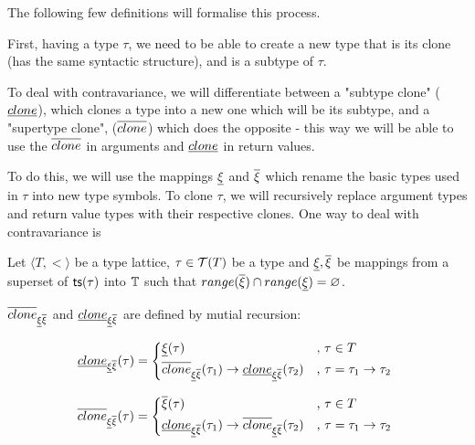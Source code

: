 \documentclass[main.tex]{subfiles}
\begin{document}
The following few definitions will formalise this process.

First, having a type $\tau$, we need to be able to create a new type
that is its clone
(has the same syntactic structure), and is a subtype of $\tau$.

To deal with contravariance, we will differentiate between a "subtype clone"
($\underline{clone}$),
which clones a type into a new one which will be its subtype, and a
"supertype clone", ($\overline{clone}$)
which does the opposite - this way we will be able to
use the $\overline{clone}$ in arguments and $\underline{clone}$ in return
values.

To do this, we will use the mappings $\underline{\xi}$ and $\overline{\xi}$
which rename the basic types used in $\tau$ into new type symbols. To clone
$\tau$, we will recursively replace argument types and return value types
with their respective clones. One way to deal with contravariance is

\newcommand\clonesub{\subtyper{clone}_{\subtyper{\xi} \suptyper{\xi}}}
\newcommand\clonesup{\suptyper{clone}_{\subtyper{\xi} \suptyper{\xi}}}

\begin{defn}
    Let $\langle T, \less \rangle$ be a type lattice, $\tau \in \mathcal{T}( T )$
    be a type and $\underline{\xi}, \overline{\xi}$ be mappings from a
    superset of
    $\mathsf{ts}(\tau)$ into $\mathbb{T}$ such that
    $range(\overline{\xi}) \cap range(\underline{\xi}) = \varnothing$.

    $\overline{clone}_{\underline{\xi} \overline{\xi}}$ and
    $\underline{clone}_{\underline{\xi} \overline{\xi}}$ are defined by
    mutial recursion:

    \[
        \subtyper{clone}_{\subtyper{\xi} \suptyper{\xi}}(\tau) =
        \begin{cases*}
            \subtyper{\xi}(\tau)& ,
                $\tau \in T$ \\
            \suptyper{clone}_{\subtyper{\xi} \suptyper{\xi}}(\tau_1)
                \tot \subtyper{clone}_{\subtyper{\xi} \suptyper{\xi}}(\tau_2)& ,
                $\tau = \tau_1 \tot \tau_2$ \\
        \end{cases*}
    \]

    \[
        \suptyper{clone}_{\subtyper{\xi} \suptyper{\xi}}(\tau) =
        \begin{cases*}
            \suptyper{\xi}(\tau)& ,
                $\tau \in T$ \\
            \subtyper{clone}_{\subtyper{\xi} \suptyper{\xi}}(\tau_1)
                \tot \suptyper{clone}_{\subtyper{\xi} \suptyper{\xi}}(\tau_2)& ,
                $\tau = \tau_1 \tot \tau_2$ \\
        \end{cases*}
    \]

\end{defn}
\end{document}
